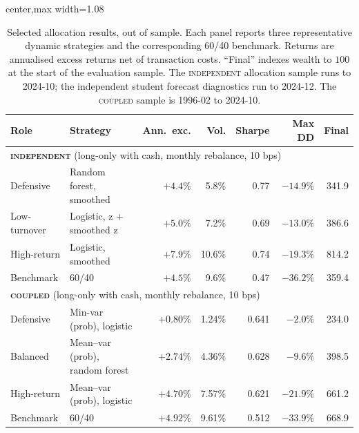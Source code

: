 \documentclass[10pt]{article}
\newcommand{\Acoup}{\textsc{coupled}}
\newcommand{\Bindep}{\textsc{independent}}
\begin{document}
\begin{table}[H]
\centering
\caption{Selected allocation results, out of sample. Each panel reports three representative dynamic
strategies and the corresponding 60/40 benchmark. Returns are annualised excess returns net
of transaction costs. ``Final'' indexes wealth to $100$ at the start of the evaluation
sample. The \Bindep{} allocation sample runs to 2024-10; the independent student forecast
diagnostics run to 2024-12. The \Acoup{} sample is 1996-02 to 2024-10.}
\label{tab:alloc-frontier}
\small
\begin{adjustbox}{center,max width=1.08\textwidth}
\begin{tabular}{llrrrrr}
\toprule
Role & Strategy & Ann.\ exc. & Vol. & Sharpe & Max DD & Final \\
\midrule
\multicolumn{7}{l}{\textbf{\Bindep{}} (long-only with cash, monthly rebalance, 10 bps)}\\
\midrule
Defensive    & Random forest, smoothed         & $+4.4\%$ & 5.8\%  & 0.77 & $-14.9\%$ & 341.9 \\
Low-turnover & Logistic, z + smoothed z        & $+5.0\%$ & 7.2\%  & 0.69 & $-13.0\%$ & 386.6 \\
High-return  & Logistic, smoothed              & $+7.9\%$ & 10.6\% & 0.74 & $-19.3\%$ & 814.2 \\
Benchmark    & 60/40                           & $+4.5\%$ & 9.6\%  & 0.47 & $-36.2\%$ & 359.4 \\
\midrule
\multicolumn{7}{l}{\textbf{\Acoup{}} (long-only with cash, monthly rebalance, 10 bps)}\\
\midrule
Defensive   & Min-var (prob), logistic        & $+0.80\%$ & 1.24\%  & 0.641 & $-2.0\%$  & 234.0 \\
Balanced    & Mean--var (prob), random forest & $+2.74\%$ & 4.36\%  & 0.628 & $-9.6\%$  & 398.5 \\
High-return & Mean--var (prob), logistic      & $+4.70\%$ & 7.57\%  & 0.621 & $-21.9\%$ & 661.2 \\
Benchmark   & 60/40                           & $+4.92\%$ & 9.61\%  & 0.512 & $-33.9\%$ & 668.9 \\
\bottomrule
\end{tabular}
\end{adjustbox}
\end{table}
\end{document}
